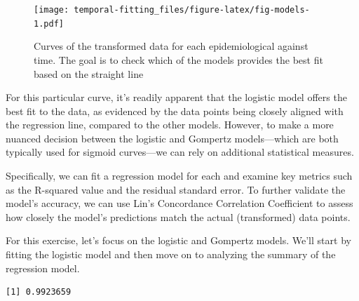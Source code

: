 \documentclass[
  letterpaper,
]{book}
\newenvironment{Shaded}{\begin{snugshade}}{\end{snugshade}}
\newcommand{\AttributeTok}[1]{\textcolor[rgb]{0.40,0.45,0.13}{#1}}
\newcommand{\CommentTok}[1]{\textcolor[rgb]{0.37,0.37,0.37}{#1}}
\newcommand{\FunctionTok}[1]{\textcolor[rgb]{0.28,0.35,0.67}{#1}}
\newcommand{\NormalTok}[1]{\textcolor[rgb]{0.00,0.23,0.31}{#1}}
\newcommand{\OtherTok}[1]{\textcolor[rgb]{0.00,0.23,0.31}{#1}}
\newcommand{\SpecialCharTok}[1]{\textcolor[rgb]{0.37,0.37,0.37}{#1}}
\newcommand{\StringTok}[1]{\textcolor[rgb]{0.13,0.47,0.30}{#1}}
\begin{document}
\begin{figure}

{\centering \texttt{[image: temporal-fitting\_files/figure-latex/fig-models-1.pdf]}

}

\caption{\label{fig-models}Curves of the transformed data for each
epidemiological against time. The goal is to check which of the models
provides the best fit based on the straight line}

\end{figure}

For this particular curve, it's readily apparent that the logistic model
offers the best fit to the data, as evidenced by the data points being
closely aligned with the regression line, compared to the other models.
However, to make a more nuanced decision between the logistic and
Gompertz models---which are both typically used for sigmoid curves---we
can rely on additional statistical measures.

Specifically, we can fit a regression model for each and examine key
metrics such as the R-squared value and the residual standard error. To
further validate the model's accuracy, we can use Lin's Concordance
Correlation Coefficient to assess how closely the model's predictions
match the actual (transformed) data points.

For this exercise, let's focus on the logistic and Gompertz models.
We'll start by fitting the logistic model and then move on to analyzing
the summary of the regression model.

\begin{Shaded}
\end{Shaded}

\begin{verbatim}
[1] 0.9923659
\end{verbatim}
\end{document}
